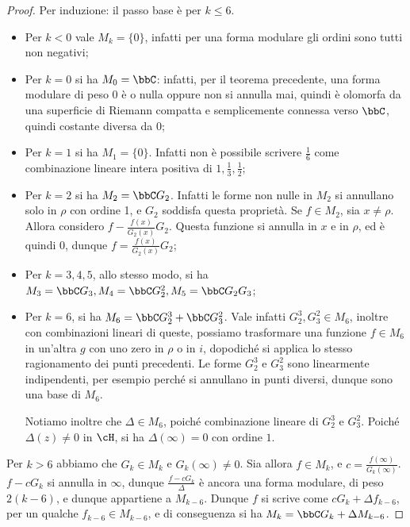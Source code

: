 \begin{proof}
	Per induzione: il passo base è per $k\leq6$.
	\begin{itemize}
		\item Per $k < 0$ vale $M_k = \{ 0 \}$, infatti per una forma modulare gli ordini sono tutti non negativi;
		
		\item Per $k = 0$ si ha $M_0 = \bbC$: infatti, per il teorema precedente, una forma modulare di peso $0$ è o nulla oppure non si annulla mai, quindi è olomorfa da una superficie di Riemann compatta e semplicemente connessa verso $\bbC$, quindi costante diversa da $0$;
		
		\item Per $k = 1$ si ha $M_1=\{0\}$. Infatti non è possibile scrivere $\frac{1}{6}$ come combinazione lineare intera positiva di $1, \frac{1}{3}, \frac{1}{2}$;
		
		\item Per $k = 2$ si ha $M_2=\bbC G_2$. Infatti le forme non nulle in $M_2$ si annullano solo in $\rho$ con ordine 1,
		e $G_2$ soddisfa questa proprietà. Se $f\in M_2$, sia $x\neq\rho$. Allora considero $f-\frac{f(x)}{G_2(x)}G_2$. Questa funzione si annulla in $x$ e in $\rho$, ed è quindi $0$, dunque $f=\frac{f(x)}{G_2(x)}G_2$;
		
		\item Per $k = 3, 4, 5$, allo stesso modo, si ha $M_3=\bbC G_3, M_4=\bbC G_2^2, M_5= \bbC G_2G_3$;
		
		\item Per $k = 6$, si ha $M_6 = \bbC G_2^3 + \bbC G_3^2$. Vale infatti $G_2^3, G_3^2 \in M_6$, inoltre con combinazioni lineari di queste, possiamo trasformare una funzione $f \in M_6$ in un'altra $g$ con uno zero in $\rho$ o in $i$, dopodiché si applica lo stesso ragionamento dei punti precedenti.
		Le forme $G_2^3$ e $G_3^2$ sono linearmente indipendenti, per esempio perché si annullano in punti diversi, dunque sono una base di $M_6$.
		
		Notiamo inoltre che $\Delta \in M_6$, poiché combinazione lineare di $G_2^3$ e $G_3^2$.
		Poiché $\Delta(z) \neq 0$ in $\cH$, si ha $\Delta(\infty) = 0$ con ordine $1$.
	\end{itemize}
	
	Per $k > 6$ abbiamo che $G_k \in M_k$ e $G_k(\infty) \neq 0$.
	Sia allora $f \in M_k$, e $c=\frac{f(\infty)}{G_k(\infty)}$. $f-cG_k$ si annulla in $\infty$, dunque $\frac{f-cG_k}{\Delta}$ è ancora una forma modulare, di peso $2(k-6)$, e dunque appartiene a $M_{k-6}$.
	Dunque $f$ si scrive come $cG_k+\Delta f_{k-6}$, per un qualche $f_{k-6} \in M_{k-6}$, e di conseguenza si ha $M_k=\bbC G_k + \Delta M_{k-6}$.
	

\end{proof}
